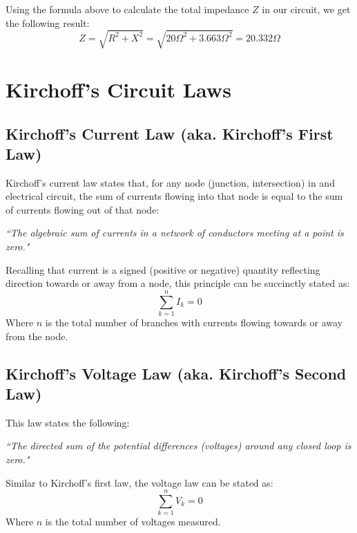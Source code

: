 \documentclass[12pt,a4paper,oneside]{article}
\begin{document}
Using the formula above to calculate the total impedance \(Z\) in our circuit, we get the following result:
\[
	Z = \sqrt{R^2 + X^2} = \sqrt{20\Omega^2 + 3.663\Omega^2} = 20.332\Omega
\]
\section{Kirchoff's Circuit Laws}
\subsection{Kirchoff's Current Law (aka. Kirchoff's First Law)}
Kirchoff's current law states that, for any node (junction, intersection) in and electrical circuit, the sum of currents flowing into that node is equal to the sum of currents flowing out of that node:

\begin{center}
	\textit{``The algebraic sum of currents in a network of conductors meeting at a point is zero."}
\end{center}
Recalling that current is a signed (positive or negative) quantity reflecting direction towards or away from a node, this principle can be succinctly stated as:
\[
	\sum_{k=1}^n I_k = 0
\]
Where \(n\) is the total number of branches with currents flowing towards or away from the node.
\subsection{Kirchoff's Voltage Law (aka. Kirchoff's Second Law)}
This law states the following:
\begin{center}
	\textit{``The directed sum of the potential differences (voltages) around any closed loop is zero."}
\end{center}
Similar to Kirchoff's first law, the voltage law can be stated as:
\[
	\sum_{k=1}^n V_k = 0
\]
Where \(n\) is the total number of voltages measured.
\end{document}
